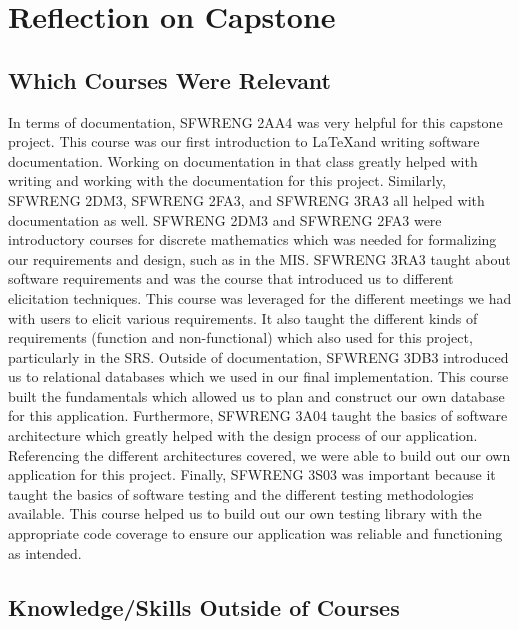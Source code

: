 \documentclass{article}
\begin{document}
\section{Reflection on Capstone}


\subsection{Which Courses Were Relevant}


In terms of documentation, SFWRENG 2AA4 was very helpful for this capstone project. This course was our first
introduction to \LaTeX and writing software documentation. Working on documentation in that class greatly helped
with writing and working with the documentation for this project. Similarly, SFWRENG 2DM3, SFWRENG 2FA3, and SFWRENG 3RA3
all helped with documentation as well. SFWRENG 2DM3 and SFWRENG 2FA3 were introductory courses for discrete mathematics
which was needed for formalizing our requirements and design, such as in the MIS. SFWRENG 3RA3 taught about software requirements and was the course
that introduced us to different elicitation techniques. This course was leveraged for the different meetings we had with users to elicit
various requirements. It also taught the different kinds of requirements (function and non-functional) which also used for this project, particularly
in the SRS. Outside of documentation, SFWRENG 3DB3 introduced us to relational databases which we used in our final
implementation. This course built the fundamentals which allowed us to plan and construct our own database for this application.
Furthermore, SFWRENG 3A04 taught the basics of software architecture which greatly helped with the design process of our
application. Referencing the different architectures covered, we were able to build out our own application for this project. Finally,
SFWRENG 3S03 was important because it taught the basics of software testing and the different testing methodologies available. This
course helped us to build out our own testing library with the appropriate code coverage to ensure our application was reliable
and functioning as intended.

\subsection{Knowledge/Skills Outside of Courses}

\end{document}
